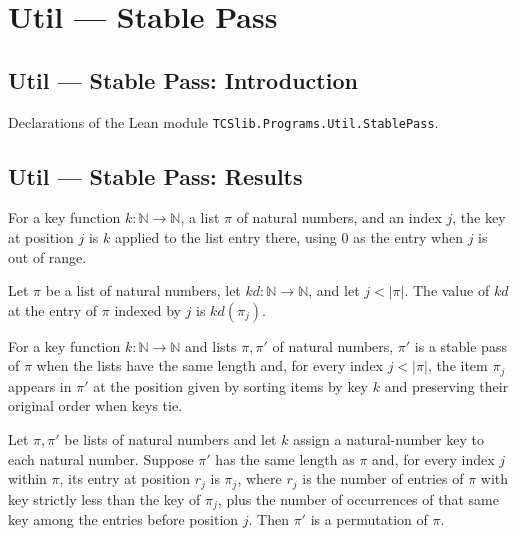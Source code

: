 \section{Util --- Stable Pass}
\subsection*{Util --- Stable Pass: Introduction}

Declarations of the Lean module \texttt{TCSlib.Programs.Util.StablePass}.

\subsection*{Util --- Stable Pass: Results}

\begin{definition}
\label{Light.keyAt}
\leanok
For a key function $k:\mathbb{N}\to\mathbb{N}$, a list $\pi$ of natural numbers, and an
index $j$, the key at position $j$ is $k$ applied to the list entry there, using $0$ as
the entry when $j$ is out of range.
\end{definition}

\begin{theorem}
\label{Light.keyAt_eq}
\leanok
{}
Let $\pi$ be a list of natural numbers, let $kd:\mathbb N\to\mathbb N$, and let
$j<|\pi|$. The value of $kd$ at the entry of $\pi$ indexed by $j$ is $kd(\pi_j)$.
\end{theorem}

\begin{definition}
\label{Light.IsStablePass}
\leanok
{}
For a key function $k:\mathbb{N}\to\mathbb{N}$ and lists $\pi,\pi\prime$ of natural
numbers, $\pi\prime$ is a stable pass of $\pi$ when the lists have the same length and,
for every index $j<|\pi|$, the item $\pi_j$ appears in $\pi\prime$ at the position
given by sorting items by key $k$ and preserving their original order when keys tie.
\end{definition}

\begin{theorem}
\label{Light.IsStablePass.perm}
\leanok
{}
Let $\pi,\pi'$ be lists of natural numbers and let $k$ assign a natural-number key to
each natural number. Suppose $\pi'$ has the same length as $\pi$ and, for every index
$j$ within $\pi$, its entry at position $r_j$ is $\pi_j$, where $r_j$ is the number of
entries of $\pi$ with key strictly less than the key of $\pi_j$, plus the number of
occurrences of that same key among the entries before position $j$. Then $\pi'$ is a
permutation of $\pi$.
\end{theorem}

